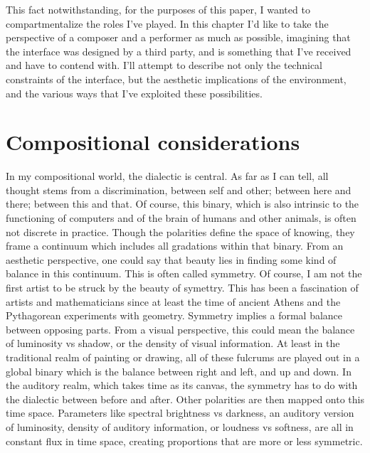 \documentclass[12pt,twoside,maitrise]{dms}
\theoremstyle{definition}
\begin{document}
This fact notwithstanding, for the purposes of this paper, I wanted to compartmentalize the roles I’ve played.
In this chapter I’d like to take the perspective of a composer and a performer as much as possible, imagining that the interface was designed by a third party, and is something that I’ve received and have to contend with.
I’ll attempt to describe not only the technical constraints of the interface, but the aesthetic implications of the environment, and the various ways that I’ve exploited these possibilities.

\section{Compositional considerations}

In my compositional world, the dialectic is central.
As far as I can tell, all thought stems from a discrimination, between self and other; between here and there; between this and that.
Of course, this binary, which is also intrinsic to the functioning of computers and of the brain of humans and other animals, is often not discrete in practice.
Though the polarities define the space of knowing, they frame a continuum which includes all gradations within that binary.
From an aesthetic perspective, one could say that beauty lies in finding some kind of balance in this continuum.
This is often called symmetry.
Of course, I am not the first artist to be struck by the beauty of symettry.
This has been a fascination of artists and mathematicians since at least the time of ancient Athens and the Pythagorean experiments with geometry.
Symmetry implies a formal balance between opposing parts.
From a visual perspective, this could mean the balance of luminosity vs shadow, or the density of visual information.
At least in the traditional realm of painting or drawing, all of these fulcrums are played out in a global binary which is the balance between right and left, and up and down.
In the auditory realm, which takes time as its canvas, the symmetry has to do with the dialectic between before and after.
Other polarities are then mapped onto this time space.
Parameters like spectral brightness vs darkness, an auditory version of luminosity, density of auditory information, or loudness vs softness, are all in constant flux in time space, creating proportions that are more or less symmetric.
\end{document}
